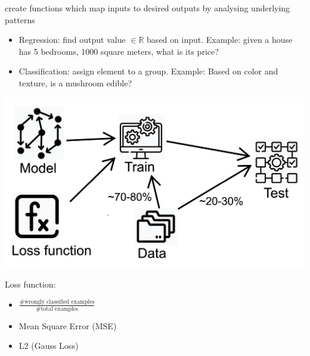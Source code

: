 create functions which map inputs to desired outputs by analysing underlying patterns
\begin{itemize}
    \item Regression: find output value $\in \mathbb{R}$ based on input. Example: given a house has 5 bedrooms, 1000 square meters, what is its price?
    \item Classification: assign element to a group. Example: Based on color and texture, is a mushroom edible?
\end{itemize}

\includegraphics[width = \linewidth]{src/8_ml/images/ml_overview.png}


Loss function:
\begin{itemize}
    \item $\frac{\text{\# wrongly classified examples}}{\text{\# total examples}}$
    \item Mean Square Error (MSE)
    \item L2 (Gauss Loss)
\end{itemize}